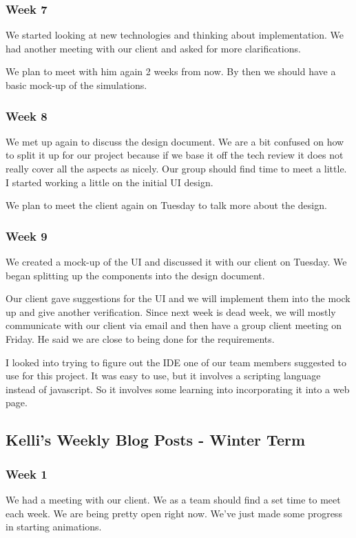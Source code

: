 \subsubsection{Week 7}
We started looking at new technologies and thinking about implementation. We had another meeting with our client and asked for more clarifications. 

We plan to meet with him again 2 weeks from now. By then we should have a basic mock-up of the simulations. 

\subsubsection{Week 8}
We met up again to discuss the design document. We are a bit confused on how to split it up for our project because if we base it off the tech review it does not really cover all the aspects as nicely. Our group should find time to meet a little. I started working a little on the initial UI design. 

We plan to meet the client again on Tuesday to talk more about the design. 

\subsubsection{Week 9}
We created a mock-up of the UI and discussed it with our client on Tuesday. We began splitting up the components into the design document.

Our client gave suggestions for the UI and we will implement them into the mock up and give another verification. Since next week is dead week, we will mostly communicate with our client via email and then have a group client meeting on Friday. He said we are close to being done for the requirements. 

I looked into trying to figure out the IDE one of our team members suggested to use for this project. It was easy to use, but it involves a scripting language instead of javascript. So it involves some learning into incorporating it into a web page. 


\subsection{Kelli's Weekly Blog Posts - Winter Term}

\subsubsection{Week 1}
We had a meeting with our client. We as a team should find a set time to meet each week. We are being pretty open right now. We've just made some progress in starting animations.

